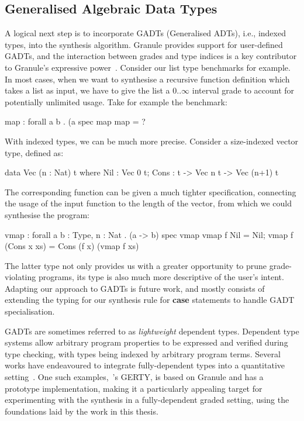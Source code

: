 \subsection{Generalised Algebraic Data Types}
A logical next step is to incorporate GADTs (Generalised ADTs),
i.e., indexed types,  into the synthesis algorithm.
Granule provides support for user-defined GADTs, and the interaction
between grades and type indices is a key contributor to Granule's expressive power~\citep{DBLP:journals/pacmpl/OrchardLE19}.
Consider our list type benchmarks for example. In most cases, when we want to
synthesise a recursive function definition which takes a list as input, we have
to give the list a $0..\infty$ interval grade to account for potentially unlimited
usage. Take for example the  benchmark:
\begin{granule}
map : forall a b . (a %
spec
    map %
map = ?
\end{granule}
With indexed types, we can be much more precise. Consider a size-indexed vector type,
defined as:
\begin{granule}
data Vec (n : Nat) t where
  Nil  : Vec 0 t;
  Cons : t -> Vec n t -> Vec (n+1) t
\end{granule}
%
The corresponding  function
can be given a much tighter specification, connecting the usage of the
input function to the length of the vector, from which we could
synthesise the program:
\begin{granule}
vmap : forall {a b : Type, n : Nat} . (a -> b) %
spec
    vmap %
vmap f Nil = Nil;
vmap f (Cons x xs) = Cons (f x) (vmap f xs)
\end{granule}
The latter type not only provides us with a greater opportunity to prune
grade-violating programs, its type is also much more descriptive of the user's intent.
Adapting our approach to GADTs is future work, and mostly consists of extending
the typing for our synthesis rule for \textbf{case} statements to handle GADT specialisation.

GADTs are sometimes referred to as \emph{lightweight} dependent types. Dependent
type systems allow arbitrary program properties to be expressed and verified
during type checking, with types being indexed by arbitrary program terms.
Several works have endeavoured to integrate fully-dependent types into a
quantitative setting~\citep{DBLP:journals/pacmpl/ChoudhuryEEW21,
10.1145/3607862, McBride2016, 10.1145/2676726.2676969}. One such
examples,~\citet{DBLP:conf/esop/MoonEO21}'s \textsc{GERTY}, is based on Granule
and has a prototype implementation, making it a particularly appealing target
for experimenting with the synthesis in a fully-dependent graded setting, using
the foundations laid by the work in this thesis.


